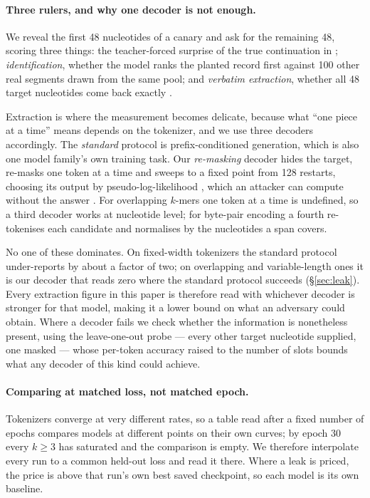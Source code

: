 \paragraph{Three rulers, and why one decoder is not enough.}
We reveal the first 48 nucleotides of a canary and ask for the remaining 48, scoring three things:
the teacher-forced surprise of the true continuation in \bits; \emph{identification}, whether the
model ranks the planted record first against 100 other real segments drawn from the same pool; and
\emph{verbatim extraction}, whether all 48 target nucleotides come back exactly
\citep{carlini2023quantifying}.

Extraction is where the measurement becomes delicate, because what ``one piece at a time'' means
depends on the tokenizer, and we use three decoders accordingly. The \emph{standard} protocol is
prefix-conditioned generation, which is also one model family's own training task. Our
\emph{re-masking} decoder hides the target, re-masks one token at a time and sweeps to a fixed point
from 128 restarts, choosing its output by pseudo-log-likelihood \citep{salazar2020pll}, which an
attacker can compute without the answer \citep{mireshghallah2022mlm}. For overlapping $k$-mers one
token at a time is undefined, so a third decoder works at nucleotide level; for byte-pair encoding a
fourth re-tokenises each candidate and normalises by the nucleotides a span covers.

No one of these dominates. On fixed-width tokenizers the standard protocol under-reports by about a
factor of two; on overlapping and variable-length ones it is our decoder that reads zero where the
standard protocol succeeds (\S\ref{sec:leak}). Every extraction figure in this paper is therefore
read with whichever decoder is stronger for that model, making it a lower bound on what an adversary
could obtain. Where a decoder fails we check whether the information is nonetheless present, using
the leave-one-out probe --- every other target nucleotide supplied, one masked --- whose per-token
accuracy raised to the number of slots bounds what any decoder of this kind could achieve.

\paragraph{Comparing at matched loss, not matched epoch.}
Tokenizers converge at very different rates, so a table read after a fixed number of epochs compares
models at different points on their own curves; by epoch 30 every $k\ge3$ has saturated and the
comparison is empty. We therefore interpolate every run to a common held-out loss and read it there.
Where a leak is priced, the price is \bits{} above that run's own best saved checkpoint, so each
model is its own baseline.

